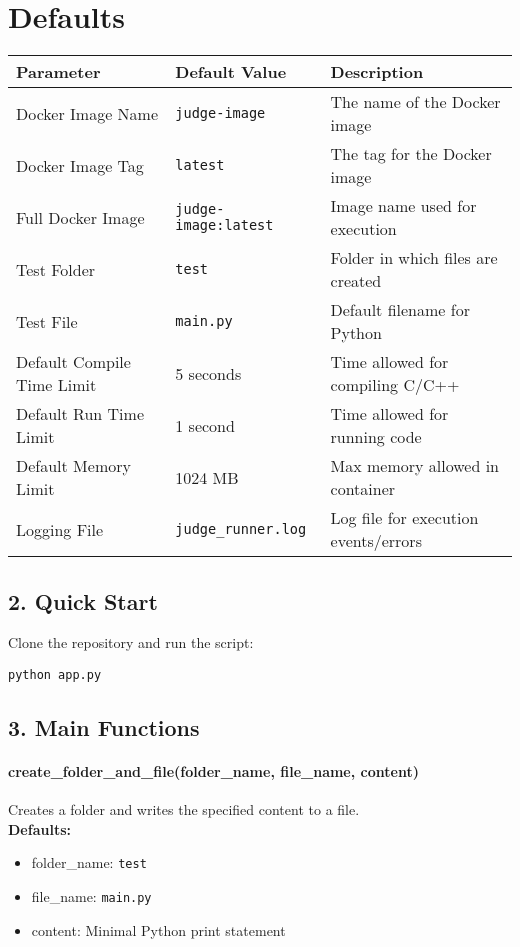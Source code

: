 \documentclass{article}
\begin{document}
\section*{Defaults}
\begin{longtable}{|p{4cm}|p{5cm}|p{6cm}|}
\hline
\textbf{Parameter} & \textbf{Default Value} & \textbf{Description} \\
\hline
Docker Image Name & \texttt{judge-image} & The name of the Docker image \\
Docker Image Tag & \texttt{latest} & The tag for the Docker image \\
Full Docker Image & \texttt{judge-image:latest} & Image name used for execution \\
Test Folder & \texttt{test} & Folder in which files are created \\
Test File & \texttt{main.py} & Default filename for Python \\
Default Compile Time Limit & 5 seconds & Time allowed for compiling C/C++ \\
Default Run Time Limit & 1 second & Time allowed for running code \\
Default Memory Limit & 1024 MB & Max memory allowed in container \\
Logging File & \texttt{judge\_runner.log} & Log file for execution events/errors \\
\hline
\end{longtable}

\subsection*{2. Quick Start}
Clone the repository and run the script:
\begin{verbatim}
python app.py
\end{verbatim}

\subsection*{3. Main Functions}

\paragraph{create\_folder\_and\_file(folder\_name, file\_name, content)}
Creates a folder and writes the specified content to a file. \\
\textbf{Defaults:}
\begin{itemize}
    \item folder\_name: \texttt{test}
    \item file\_name: \texttt{main.py}
    \item content: Minimal Python print statement
\end{itemize}
\end{document}
